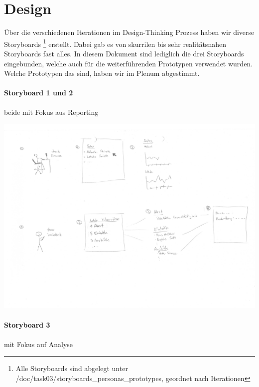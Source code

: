 \documentclass[a4paper]{scrreprt}
\begin{document}
\pagebreak

\section{Design}
Über die verschiedenen Iterationen im Design-Thinking Prozess haben wir diverse Storyboards \footnote{Alle Storyboards sind  abgelegt unter /doc/task03/storyboards\_personas\_prototypes, geordnet nach Iterationen} erstellt. Dabei gab es von skurrilen bis sehr realitätsnahen Storyboards fast alles. In diesem Dokument sind lediglich die drei Storyboards eingebunden, welche auch für die weiterführenden Prototypen verwendet wurden. Welche Prototypen das sind, haben wir im Plenum abgestimmt.

\paragraph{Storyboard 1 und 2} beide mit Fokus aus Reporting

\includegraphics[width=1\textwidth]{storyboards_personas_prototypes/iteration3/sidlm3_storyboard2+3.png}


\pagebreak

\paragraph{Storyboard 3} mit Fokus auf Analyse
\end{document}
